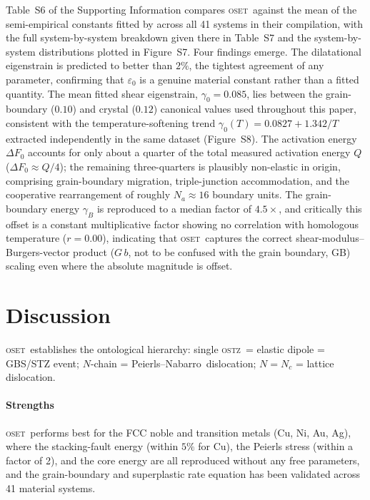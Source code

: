\documentclass[3p]{elsarticle}
\newcommand{\OSTZ}{\textsc{ostz}}
\newcommand{\OSET}{\textsc{oset}}
\newcommand{\dF}{\Delta F_0}
\newcommand{\gz}{\gamma_0}
\newcommand{\PN}{Peierls--Nabarro}
\begin{document}
\label{sec:harisankar}
Table~S6 of the Supporting Information compares \OSET\ against the
mean of the semi-empirical constants fitted by
\citet{harisankar2025} across all 41 systems in their
compilation, with the full system-by-system breakdown given there in
Table~S7 and the system-by-system distributions plotted in
Figure~S7. Four findings emerge. The
dilatational eigenstrain is predicted to better than $2\%$, the
tightest agreement of any parameter, confirming that $\varepsilon_0$
is a genuine material constant rather than a fitted quantity. The
mean fitted shear eigenstrain, $\gz=0.085$, lies between the
grain-boundary ($0.10$) and crystal ($0.12$) canonical values used
throughout this paper, consistent with the temperature-softening
trend $\gz(T)=0.0827+1.342/T$ extracted independently in the same
dataset (Figure~S8). The activation energy $\dF$ accounts for only about a
quarter of the total measured activation energy $Q$
($\dF\approx Q/4$); the remaining three-quarters is plausibly
non-elastic in origin, comprising grain-boundary migration,
triple-junction accommodation, and the cooperative rearrangement of
roughly $N_a\approx16$ boundary units. The grain-boundary energy
$\gamma_B$ is reproduced to a median factor of $4.5\times$, and
critically this offset is a constant multiplicative factor showing
no correlation with homologous temperature ($r=0.00$), indicating
that \OSET\ captures the correct shear-modulus--Burgers-vector
product ($G\,b$, not to be confused with the grain boundary, GB)
scaling even where the absolute magnitude is offset.

\section{Discussion}
\label{sec:discussion}

\OSET\ establishes the ontological hierarchy: single \OSTZ\ = elastic
dipole = GBS/STZ event; $N$-chain = \PN\ dislocation;
$N=N_c$ = lattice dislocation.

\paragraph{Strengths}
\OSET\ performs best for the FCC noble and transition metals (Cu,
Ni, Au, Ag), where the stacking-fault energy (within $5\%$ for Cu),
the Peierls stress (within a factor of 2), and the core energy are
all reproduced without any free parameters, and the grain-boundary
and superplastic rate equation has been validated across 41
material systems.
\end{document}
